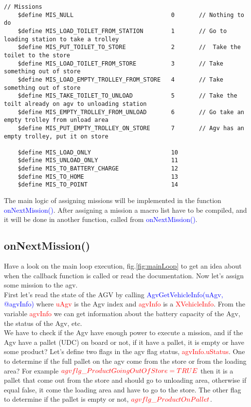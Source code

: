 \begin{lstlisting}[caption= Agv Missions, label=lstStoreMissions]
	// Missions
	$define MIS_NULL							0		// Nothing to do
	$define MIS_LOAD_TOILET_FROM_STATION		1		// Go to loading station to take a trolley
	$define MIS_PUT_TOILET_TO_STORE				2		//  Take the toilet to the store
	$define MIS_LOAD_TOILET_FROM_STORE			3		// Take something out of store
	$define MIS_LOAD_EMPTY_TROLLEY_FROM_STORE	4		// Take something out of store
	$define MIS_TAKE_TOILET_TO_UNLOAD			5		// Take the toilt already on agv to unloading station
	$define MIS_EMPTY_TROLLEY_FROM_UNLOAD		6		// Go take an empty trolley from unload area
	$define MIS_PUT_EMPTY_TROLLEY_ON_STORE		7		// Agv has an empty trolley, put it on store
	
	$define MIS_LOAD_ONLY						10
	$define MIS_UNLOAD_ONLY						11
	$define MIS_TO_BATTERY_CHARGE				12
	$define MIS_TO_HOME							13
	$define MIS_TO_POINT						14
\end{lstlisting}

The main logic of assigning missions will be implemented in the function \textcolor{blue}{onNextMission()}. After assigning a mission a macro list have to be compiled, and it will be done in another function, called from \textcolor{blue}{onNextMission()}.

%
\subsection{onNextMission()}
Have a look on the main loop execution, fig.\ref{fig:mainLoop} to get an idea about when the callback function is called or read the documentation. Now let's assign some mission to the agv.\\

First let's read the state of the AGV by calling \textcolor{blue}{AgvGetVehicleInfo(uAgv, @agvInfo)} where \textcolor{red}{uAgv} is the Agv index and \textcolor{red}{agvInfo} is a \textcolor{red}{XVehicleInfo}. From the variable \textcolor{red}{agvInfo} we can get information about the battery capacity of the Agv, the status of the Agv, etc.\\

We have to check if the Agv have enough power to execute a mission, and if the Agv have a pallet (UDC) on board or not, if it have a pallet, it is empty or have some product?
Let's define two flags in the agv flag status, \textcolor{red}{agvInfo.uStatus}. One to determine if the full pallet on the agv come from the store or from the loading area? For example $\textcolor{red}{agvflg\_ProductGoingOutOfStore=TRUE}$ then it is a pallet that come out from the store and should go to unloading area, otherwise if equal false, it come the loading area and have to go to the store.
The other flag to determine if the pallet is empty or not, $\textcolor{red}{agvflg\_ProductOnPallet}$.


